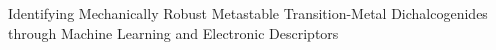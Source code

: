 \documentclass[]{article}
\begin{document}
Identifying Mechanically Robust Metastable Transition-Metal Dichalcogenides through Machine Learning and Electronic Descriptors
\end{document}
